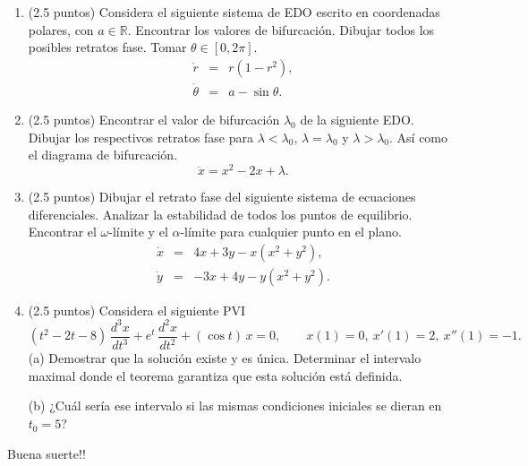 \documentclass[11pt]{article}
\begin{document}
\begin{enumerate}
\item (2.5 puntos) Considera el siguiente sistema de EDO escrito en coordenadas polares, con $a\in\mathbb{R}$. Encontrar los valores de bifurcación. Dibujar todos los posibles retratos fase. Tomar $\theta\in[0,2\pi]$.
\begin{eqnarray*}
\dot r &=& r(1-r^2), \\
\dot\theta &=& a-\sin\theta.
\end{eqnarray*}
\vspace{0.15cm}

\item (2.5 puntos) Encontrar el valor de bifurcación $\lambda_0$ de la siguiente EDO. Dibujar los respectivos retratos fase para $\lambda<\lambda_0$, $\lambda=\lambda_0$ y $\lambda>\lambda_0$. Así como el diagrama de bifurcación.
$$\ddot x=x^2-2x+\lambda.$$
\vspace{0.15cm}

\item (2.5 puntos) Dibujar el retrato fase del siguiente sistema de ecuaciones diferenciales. Analizar la estabilidad de todos los puntos de equilibrio. Encontrar el $\omega$-límite y el $\alpha$-límite para cualquier punto en el plano.
\begin{eqnarray*}
\dot x &=& 4x+3y-x(x^2+y^2), \\
\dot y &=& -3x+4y-y(x^2+y^2).
\end{eqnarray*}
\vspace{0.15cm}

\item (2.5 puntos) Considera el siguiente PVI
$$(t^2-2t-8)\,\frac{d^3x}{dt^3}+e^t\,\frac{d^2x}{dt^2}+(\cos t)\,x=0,\qquad x(1)=0,\ x'(1)=2,\ x''(1)=-1.$$
(a) Demostrar que la solución existe y es única. Determinar el intervalo maximal donde el teorema garantiza que esta solución está definida.

(b) ¿Cuál sería ese intervalo si las mismas condiciones iniciales se dieran en $t_0=5$?
\vspace{0.15cm}

\end{enumerate}

\vspace{0.5cm}
\begin{center}
\Large Buena suerte!!
\end{center}
\end{document}

